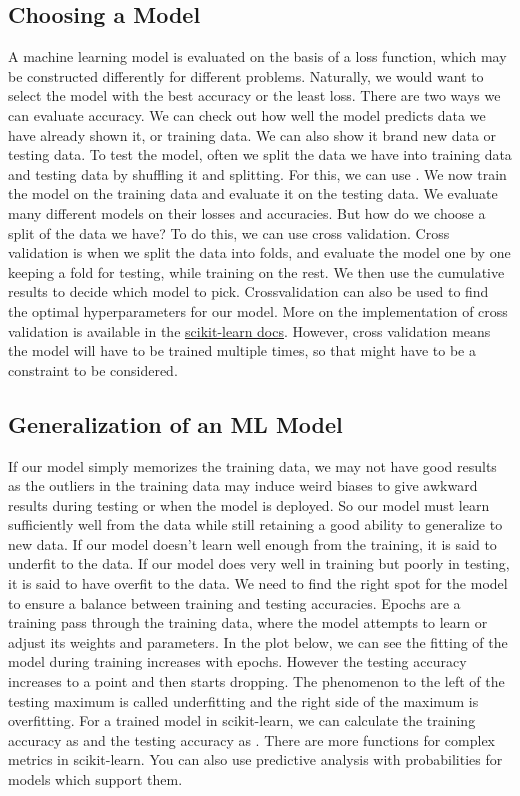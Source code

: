 \documentclass{article}
\newcommand{\code}[1]{{\fontfamily{zi4} \selectfont{#1}}}
\begin{document}
\subsection{Choosing a Model}

A machine learning model is evaluated on the basis of a loss function, which may be constructed differently for different problems. Naturally, we would want to select the model with the best accuracy or the least loss. There are two ways we can evaluate accuracy. We can check out how well the model predicts data we have already shown it, or training data. We can also show it brand new data or testing data. To test the model, often we split the data we have into training data and testing data by shuffling it and splitting. For this, we can use \code{sklearn.model\_selection.train\_test\_split}. We now train the model on the training data and evaluate it on the testing data. We evaluate many different models on their losses and accuracies. But how do we choose a split of the data we have? To do this, we can use cross validation. Cross validation is when we split the data into folds, and evaluate the model one by one keeping a fold for testing, while training on the rest. We then use the cumulative results to decide which model to pick. Crossvalidation can also be used to find the optimal hyperparameters for our model. More on the implementation of cross validation is available in the \href{https://scikit-learn.org/stable/modules/cross_validation.html}{scikit-learn docs}. However, cross validation means the model will have to be trained multiple times, so that might have to be a constraint to be considered.

\subsection{Generalization of an ML Model}

If our model simply memorizes the training data, we may not have good results as the outliers in the training data may induce weird biases to give awkward results during testing or when the model is deployed. So our model must learn sufficiently well from the data while still retaining a good ability to generalize to new data. If our model doesn't learn well enough from the training, it is said to underfit to the data. If our model does very well in training but poorly in testing, it is said to have overfit to the data. We need to find the right spot for the model to ensure a balance between training and testing accuracies. Epochs are a training pass through the training data, where the model attempts to learn or adjust its weights and parameters. In the plot below, we can see the fitting of the model during training increases with epochs. However the testing accuracy increases to a point and then starts dropping. The phenomenon to the left of the testing maximum is called underfitting and the right side of the maximum is overfitting. For a trained model in scikit-learn, we can calculate the training accuracy as \code{model.score(X\_train, y\_train)} and the testing accuracy as \code{model.score(X\_test, y\_test)}. There are more functions for complex metrics in scikit-learn. You can also use predictive analysis with probabilities for models which support them. 
\end{document}
